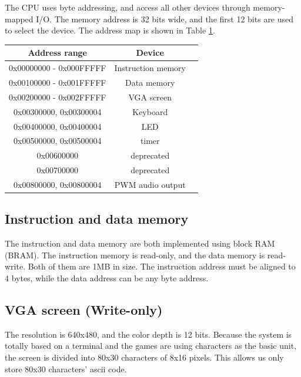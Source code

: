 \documentclass[12pt, a4paper, oneside]{article}
\begin{document}
The CPU uses byte addressing, and access all other devices through memory-mapped I/O. The memory address is 32 bits wide, and the first 12 bits are used to select the device. The address map is shown in Table \ref{tab:address-map}.
\begin{table}[h]
    \centering
    \begin{tabular}{|c|c|c|}
        \hline
        Address range           & Device             \\
        \hline
        0x00000000 - 0x000FFFFF & Instruction memory \\
        \hline
        0x00100000 - 0x001FFFFF & Data memory        \\
        \hline
        0x00200000 - 0x002FFFFF & VGA screen         \\
        \hline
        0x00300000, 0x00300004  & Keyboard           \\
        \hline
        0x00400000, 0x00400004  & LED                \\
        \hline
        0x00500000, 0x00500004  & timer              \\
        \hline
        0x00600000              & deprecated         \\
        \hline
        0x00700000              & deprecated         \\
        \hline
        0x00800000, 0x00800004  & PWM audio output   \\
        \hline
    \end{tabular}
    \label{tab:address-map}
\end{table}

\subsection{Instruction and data memory}
The instruction and data memory are both implemented using block RAM (BRAM). The instruction memory is read-only, and the data memory is read-write. Both of them are 1MB in size. The instruction address must be aligned to 4 bytes, while the data address can be any byte address.
\subsection{VGA screen (Write-only)}
The resolution is 640x480, and the color depth is 12 bits. Because the system is totally based on a terminal and the games are using characters as the basic unit, the screen is divided into 80x30 characters of 8x16 pixels. This allows us only store 80x30 characters' ascii code.
\end{document}
